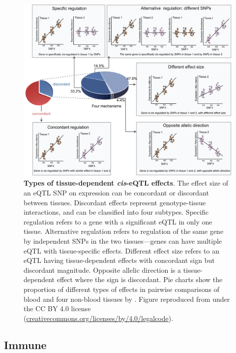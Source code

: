 \begin{outline}
\begin{figure}
    \centering
    \includegraphics[width=1.0\textwidth,page=1]{mainmatter/figures/chapter_01/fu2012UnravelingRegulatoryMechanisms/journal.pgen.1002431.g002.png}
    \caption{
        \textbf{Types of tissue-dependent \textit{cis}-\gls{eQTL} effects}.
        The effect size of an \gls{eQTL} \gls{SNP} on expression can be concordant or discordant between tissues.
        Discordant effects represent genotype-tissue interactions, and can be classified into four subtypes.
        Specific regulation refers to a gene with a significant \gls{eQTL} in only one tissue.
        Alternative regulation refers to regulation of the same gene by independent \glspl{SNP} in the two tissues---genes can have multiple \gls{eQTL} with tissue-specific effects.
        Different effect size refers to an \gls{eQTL} having tissue-dependent effects with concordant sign but discordant magnitude.
        Opposite allelic direction is a tissue-dependent effect where the sign is discordant.
        Pie charts show the proportion of different types of effects in pairwise comparisons of blood and four non-blood tissues by \textcite{fu2012UnravelingRegulatoryMechanisms}.
        Figure reproduced from \textcite{fu2012UnravelingRegulatoryMechanisms} under the CC BY 4.0 license (\url{creativecommons.org/licenses/by/4.0/legalcode}).
    }
    \label{fig:intro_reQTLtypes}
\end{figure}

\subsection{Immune }
\label{subsec:intro_reQTL}


\end{outline}
